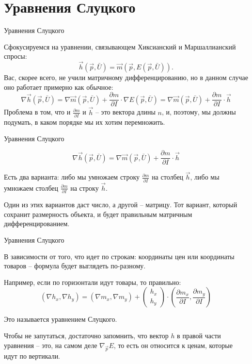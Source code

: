 \documentclass{beamer}
\begin{document}
\section{Уравнения Слуцкого}

\begin{frame}{Уравнения Слуцкого}

Сфокусируемся на уравнении, связывающем Хиксианский и Маршаллианский спросы:
$$\vec h (\vec p, \bar U) = \vec m(\vec p,  E(\vec p, \bar U)).$$
Вас, скорее всего, не учили матричному дифференцированию, но в данном случае оно работает примерно как обычное:
$$ \nabla \vec h(\vec p,  \bar U) = \nabla \vec m(\vec p,  \bar U) + \frac{\partial m}{\partial I} \cdot \nabla E(\vec p, \bar U) = \nabla \vec m(\vec p,  \bar U) + \frac{\partial m}{\partial I} \cdot \vec h $$
Проблема в том, что и $\frac{\partial m}{\partial I}$ и $\vec h$ – это вектора длины $n$, и, поэтому, мы должны подумать, в каком порядке мы их хотим перемножить. 

\end{frame}

\begin{frame}{Уравнения Слуцкого}

$$ \nabla \vec h(\vec p,  \bar U) = \nabla \vec m(\vec p,  \bar U) + \frac{\partial m}{\partial I} \cdot \vec h $$

Есть два варианта: либо мы умножаем строку $\frac{\partial m}{\partial I}$ на столбец $\vec h$, либо мы умножаем столбец $\frac{\partial m}{\partial I}$ на строку $\vec h$. 

Один из этих вариантов даст число, а другой – матрицу. Тот вариант, который сохранит размерность объекта, и будет правильным матричным дифференцированием. 

\end{frame}

\begin{frame}{Уравнения Слуцкого}

В зависимости от того, что идет по строкам: координаты цен или координаты товаров – формула будет выглядеть по-разному. 

Например, если по горизонтали идут товары, то правильно:
$$ 
(\nabla h_x, \nabla h_y) = (\nabla m_x, \nabla m_y) + 
\begin{pmatrix} 
h_x \\
h_y
\end{pmatrix} 
\cdot (\frac{\partial m_x}{\partial I}, \frac{\partial m_y}{\partial I})
$$

Это называется \alert{уравнением Слуцкого}.

Чтобы не запутаться, достаточно запомнить, что вектор $h$ в правой части уравнения – это, на самом деле $\nabla_{\vec p} E$, то есть он относится к ценам, которые идут по вертикали.

\end{frame}
\end{document}
